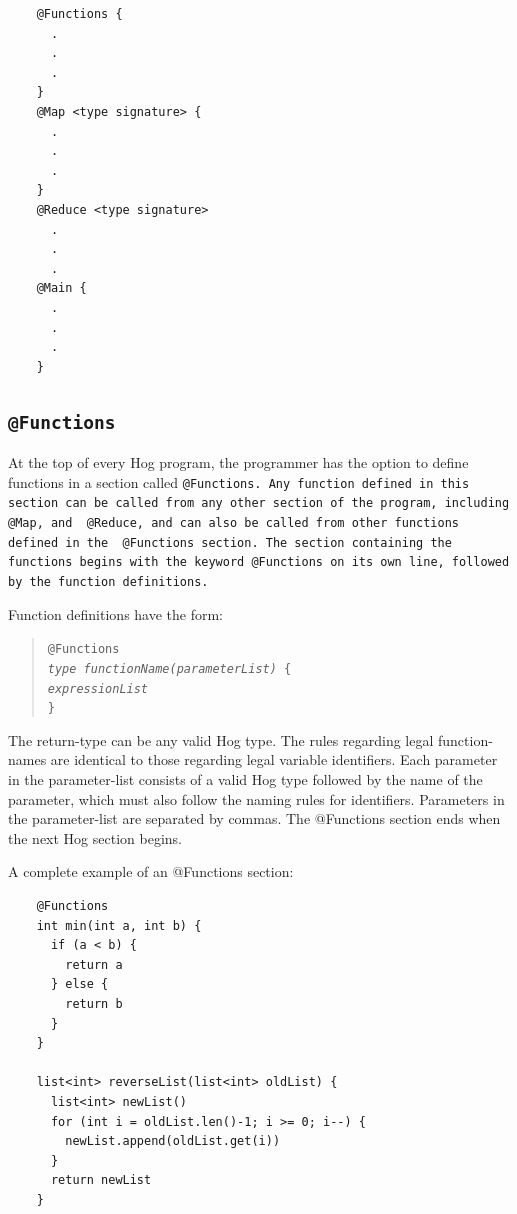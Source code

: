 \documentclass{article}
\begin{document}
\begin{verbatim}
    @Functions {
      .
      .
      .
    }
    @Map <type signature> {
      .
      .
      .
    }
    @Reduce <type signature>
      .
      .
      .
    @Main {
      .
      .
      .
    }
\end{verbatim}


\subsection{\tt @Functions\rm} %
\label{sub:tt_functionsrm}

At the top of every Hog program, the programmer has the option to define functions
in a section called \tt @Functions\rm. Any function defined in this section can be
called from any other section of the program, including \tt @Map\rm, and \tt
@Reduce\rm, and can also be called from other functions defined in the \tt
@Functions \rm section. The section containing the functions begins with the
keyword \tt @Functions \rm on its own line, followed by the function definitions.

Function definitions have the form:

\begin{quotation}
  \tt @Functions \rm \\
  \indent \emph{type functionName(parameterList)} \tt \{ \rm \\
  \indent \indent \emph{expressionList} \\
  \indent \tt \} \rm
\end{quotation}

The return-type can be any valid Hog type. The rules regarding legal function-names
are identical to those regarding legal variable identifiers. Each parameter in the
parameter-list consists of a valid Hog type followed by the name of the parameter,
which must also follow the naming rules for identifiers. Parameters in the
parameter-list are separated by commas. The @Functions section ends when the next
Hog section begins.

A complete example of an @Functions section:

\begin{verbatim}
    @Functions
    int min(int a, int b) {
      if (a < b) {
        return a
      } else {
        return b
      }
    }

    list<int> reverseList(list<int> oldList) {
      list<int> newList()
      for (int i = oldList.len()-1; i >= 0; i--) {
        newList.append(oldList.get(i))
      }
      return newList
    }
\end{verbatim}
\end{document}

